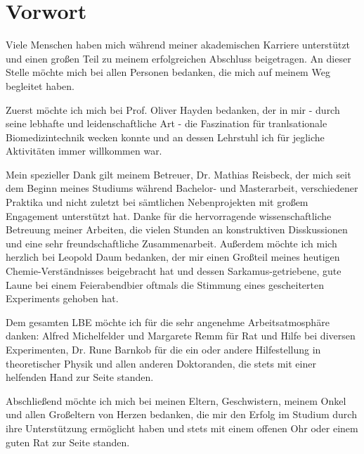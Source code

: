 \chapter*{Vorwort}
\thispagestyle{empty}
Viele Menschen haben mich während meiner akademischen Karriere unterstützt und einen großen Teil zu meinem erfolgreichen Abschluss beigetragen.  An dieser Stelle möchte mich bei allen Personen bedanken, die mich auf meinem Weg begleitet haben.

Zuerst möchte ich mich bei Prof. Oliver Hayden bedanken, der in mir - durch seine lebhafte und leidenschaftliche Art - die Faszination für tranlsationale Biomedizintechnik wecken konnte und an dessen Lehrstuhl ich für jegliche Aktivitäten immer willkommen war.

Mein spezieller Dank gilt meinem Betreuer, Dr. Mathias Reisbeck, der mich seit dem Beginn meines Studiums während Bachelor- und Masterarbeit, verschiedener Praktika und nicht zuletzt bei sämtlichen Nebenprojekten mit großem Engagement unterstützt hat. Danke für die hervorragende wissenschaftliche Betreuung meiner Arbeiten, die vielen Stunden an konstruktiven Disskussionen und eine sehr freundschaftliche Zusammenarbeit. Außerdem möchte ich mich herzlich bei Leopold Daum bedanken, der mir einen Großteil meines heutigen Chemie-Verständnisses beigebracht hat und dessen Sarkamus-getriebene, gute Laune bei einem Feierabendbier oftmals die Stimmung eines gescheiterten Experiments gehoben hat.

Dem gesamten LBE möchte ich für die sehr angenehme Arbeitsatmosphäre danken: Alfred Michelfelder und Margarete Remm für Rat und Hilfe bei diversen Experimenten, Dr. Rune Barnkob für die ein oder andere Hilfestellung in theoretischer Physik und allen anderen Doktoranden, die stets mit einer helfenden Hand zur Seite standen.

Abschließend möchte ich mich bei meinen Eltern, Geschwistern, meinem Onkel und allen Großeltern von Herzen bedanken, die mir den Erfolg im Studium durch ihre Unterstützung ermöglicht haben und stets mit einem offenen Ohr oder einem guten Rat zur Seite standen.